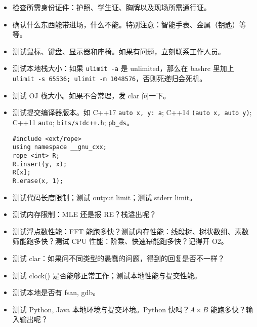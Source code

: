 
\begin{itemize}
    \setlength{\itemsep}{0pt}
    \setlength{\parskip}{1pt}
    \item 检查所需身份证件：护照、学生证、胸牌以及现场所需通行证。
    \item 确认什么东西能带进场，什么不能。特别注意：智能手表、金属（钥匙）等等。
    \item 测试鼠标、键盘、显示器和座椅。如果有问题，立刻联系工作人员。
    \item 测试本地栈大小：如果 \texttt{ulimit -a} 是 unlimited，那么在 bashrc 里加上 \texttt{ulimit -s 65536; ulimit -m 1048576}，否则死递归会死机。
    \item 测试 OJ 栈大小。如果不合常理，发 clar 问一下。
    \item 测试提交编译器版本。如 C++17 \texttt{auto \lbrack x, y\rbrack : a}; C++14 \texttt{\lbrack \rbrack (auto x, auto y)}; C++11 \texttt{auto}; \texttt{bits/stdc++.h}; \texttt{pb\_ds}。
\begin{verbatim}
#include <ext/rope>
using namespace __gnu_cxx;
rope <int> R;
R.insert(y, x);
R[x];
R.erase(x, 1);
\end{verbatim}
    \item 测试代码长度限制；测试 output limit；测试 stderr limit。
    \item 测试内存限制：MLE 还是报 RE？栈溢出呢？
    \item 测试浮点数性能：FFT 能跑多快？测试内存性能：线段树、树状数组、素数筛能跑多快？测试 CPU 性能：阶乘、快速幂能跑多快？记得开 O2。
    \item 测试 clar：如果问不同类型的愚蠢的问题，得到的回复是否不一样？
    \item 测试 clock() 是否能够正常工作；测试本地性能与提交性能。
    \item 测试本地是否有 fsan, gdb。
    \item 测试 Python, Java 本地环境与提交环境。Python 快吗？$A\times B$ 能跑多快？输入输出呢？
\end{itemize}